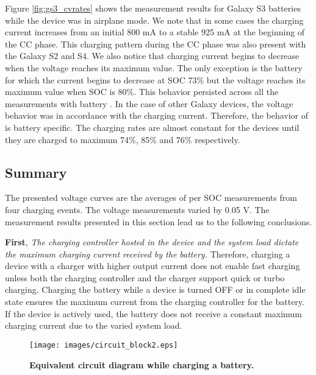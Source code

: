 \documentclass[journal]{IEEEtran}
\begin{document}
Figure \ref{fig:gs3_cvrates} shows the measurement results for Galaxy S3 batteries while the device was in airplane mode. We note that in some cases the charging current increases from an initial 800 mA to a stable 925 mA at the beginning of the CC phase. This charging pattern during the CC phase was also present with the Galaxy S2 and S4. We also notice that charging current begins to decrease when the voltage reaches its maximum value. The only exception is the battery  for which the current begins to decrease at SOC 73\% but the voltage reaches its maximum value when SOC is 80\%. This behavior persisted across all the measurements with battery . In the case of other Galaxy devices, the voltage behavior was in accordance with the charging current. Therefore, the behavior of  is battery specific. The charging rates are almost constant for the devices until they are charged to maximum 74\%, 85\% and 76\% respectively. 




\subsection{Summary}
The presented voltage curves are the averages of per SOC measurements from four charging events. The voltage measurements varied by 0.05 V. The measurement results presented in this section lead us to the following conclusions. 


\vspace{1mm}
\noindent\textbf{First}, \textit{The charging controller hosted in the device and the system load dictate the maximum charging current received by the battery.} Therefore, charging a device with a charger with higher output current does not enable fast charging unless both the charging controller and the charger support quick or turbo charging.  Charging the battery while a device is turned OFF or in complete idle state ensures the maximum current from the charging controller for the battery. If the device is actively used, the battery does not receive a constant maximum charging current due to the varied system load.

\begin{figure}[!h]
  \begin{center}
\texttt{[image: images/circuit\_block2.eps]}
    
\caption{{\bf Equivalent circuit diagram while charging a battery.}}
\label{fig:internal_res}
 \end{center}
 \end{figure}
\end{document}
